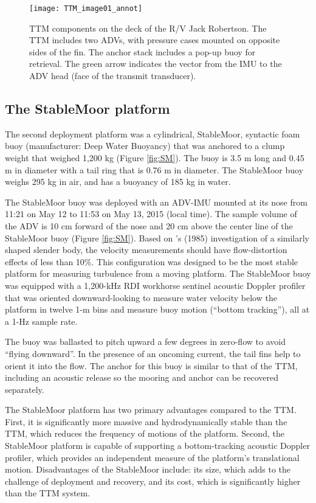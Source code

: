 \begin{figure}[t]
  \centering
  \texttt{[image: TTM\_image01\_annot]}
  \caption{TTM components on the deck of the R/V Jack Robertson. The TTM includes two ADVs, with pressure cases mounted on opposite sides of the fin. The anchor stack includes a pop-up buoy for retrieval. The green arrow indicates the vector from the IMU to the ADV head (face of the transmit transducer). }
  \label{fig:ttm:photo}
\end{figure}

\subsection{The StableMoor platform}

The second deployment platform was a cylindrical, StableMoor, syntactic foam buoy (manufacturer: Deep Water Buoyancy) that was anchored to a clump weight that weighed 1,200 kg (Figure \ref{fig:SM}). The buoy is 3.5 m long and 0.45 m in diameter with a tail ring that is 0.76 m in diameter. The StableMoor buoy weighs 295 kg in air, and has a buoyancy of 185 kg in water. 

The StableMoor buoy was deployed with an ADV-IMU mounted at its nose from 11:21 on May 12 to 11:53 on May 13, 2015 (local time). The sample volume of the ADV is 10 cm forward of the nose and 20 cm above the center line of the StableMoor buoy (Figure \ref{fig:SM}). Based on \citeauthor{Wyngaard++1985}'s (1985) investigation of a similarly shaped slender body, the velocity measurements should have flow-distortion effects of less than 10\%. This configuration was designed to be the most stable platform for measuring turbulence from a moving platform. The StableMoor buoy was equipped with a 1,200-kHz RDI workhorse sentinel acoustic Doppler profiler that was oriented downward-looking to measure water velocity below the platform in twelve 1-m bins and measure buoy motion (``bottom tracking''), all at a 1-Hz sample rate. 

The buoy was ballasted to pitch upward a few degrees in zero-flow to avoid ``flying downward''. In the presence of an oncoming current, the tail fins help to orient it into the flow. The anchor for this buoy is similar to that of the TTM, including an acoustic release so the mooring and anchor can be recovered separately.

The StableMoor platform has two primary advantages compared to the TTM. First, it is significantly more massive and hydrodynamically stable than the TTM, which reduces the frequency of motions of the platform. Second, the StableMoor platform is capable of supporting a bottom-tracking acoustic Doppler profiler, which provides an independent measure of the platform's translational motion. Disadvantages of the StableMoor include: its size, which adds to the challenge of deployment and recovery, and its cost, which is significantly higher than the TTM system.

